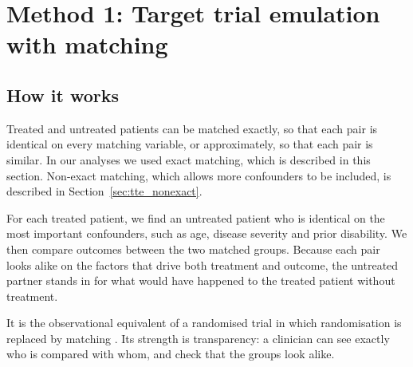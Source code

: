 \section{Method 1: Target trial emulation with matching}

\subsection{How it works}

Treated and untreated patients can be matched exactly, so that each pair is identical on every matching variable, or approximately, so that each pair is similar. In our analyses we used exact matching, which is described in this section. Non-exact matching, which allows more confounders to be included, is described in Section~\ref{sec:tte_nonexact}.

For each treated patient, we find an untreated patient who is identical on the most important confounders, such as age, disease severity and prior disability. We then compare outcomes between the two matched groups. Because each pair looks alike on the factors that drive both treatment and outcome, the untreated partner stands in for what would have happened to the treated patient without treatment.

It is the observational equivalent of a randomised trial in which randomisation is replaced by matching \cite{hernan2016bigdata,stuart2010}. Its strength is transparency: a clinician can see exactly who is compared with whom, and check that the groups look alike.

